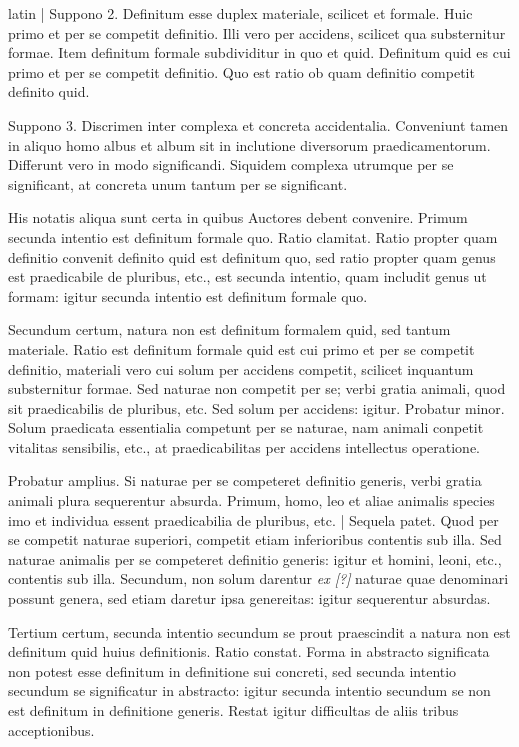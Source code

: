 \begin{otherlanguage*}{latin}
\pstart
  \textnormal{|}  Suppono 2. Definitum esse duplex materiale, scilicet et formale. Huic primo et per se competit definitio. Illi vero per accidens, scilicet qua substernitur formae. Item definitum formale subdividitur in quo et quid. Definitum quid es cui primo et per se competit definitio. Quo est ratio ob quam definitio competit definito quid. 
\pend

\pstart
  Suppono 3. Discrimen inter complexa et  concreta accidentalia. Conveniunt tamen in aliquo homo albus et album sit in inclutione diversorum praedicamentorum. Differunt vero in modo significandi. Siquidem complexa utrumque per se significant, at concreta unum tantum per se significant. 
\pend

\pstart
  His notatis aliqua sunt certa in quibus Auctores debent convenire. Primum secunda intentio est definitum formale quo. Ratio clamitat. Ratio propter quam definitio convenit definito quid est definitum quo, sed ratio propter quam genus est praedicabile de pluribus, etc., est secunda intentio, quam includit genus ut formam: igitur secunda intentio est definitum formale quo. 
\pend

\pstart
  Secundum certum, natura non est definitum formalem quid, sed tantum materiale. Ratio est definitum formale quid est cui primo et per se competit definitio, materiali vero cui solum per accidens competit, scilicet inquantum substernitur formae. Sed naturae non competit per se; verbi gratia animali, quod sit praedicabilis de pluribus, etc. Sed solum per accidens: igitur. Probatur minor. Solum praedicata essentialia competunt per se naturae, nam animali conpetit vitalitas sensibilis, etc., at praedicabilitas per accidens intellectus operatione. 
\pend

\pstart
  Probatur amplius. Si naturae per se competeret definitio generis, verbi gratia animali plura sequerentur absurda. Primum, homo, leo et aliae animalis species imo et individua essent praedicabilia de pluribus, etc. \textnormal{|} Sequela patet. Quod per se competit naturae superiori, competit etiam inferioribus contentis sub illa. Sed naturae animalis per se competeret definitio generis: igitur et homini, leoni, etc., contentis sub illa. Secundum, non solum darentur \emph{ex [?]} naturae quae denominari possunt genera, sed etiam daretur ipsa genereitas: igitur sequerentur absurdas. 
\pend

\pstart
  Tertium certum, secunda intentio secundum se prout praescindit a natura non est definitum quid huius definitionis. Ratio constat. Forma in abstracto significata non potest esse definitum in definitione sui concreti, sed secunda intentio secundum se significatur in abstracto: igitur secunda intentio secundum se non est definitum in definitione generis. Restat igitur difficultas de aliis tribus acceptionibus. 
\pend


\end{otherlanguage*}
